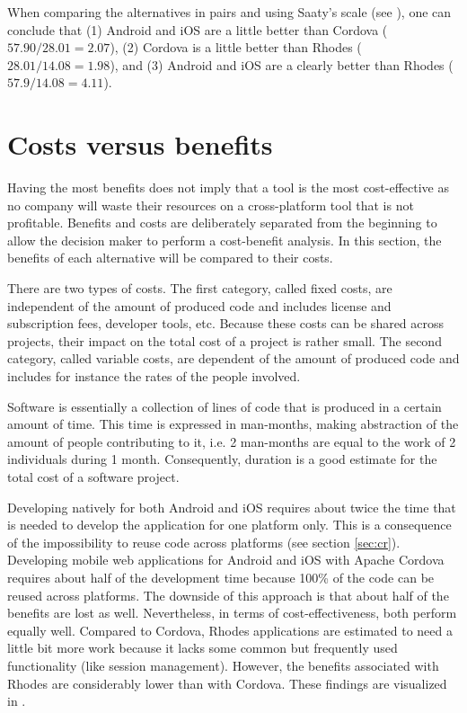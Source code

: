 When comparing the alternatives in pairs and using Saaty's scale (see ), one can conclude that (1) Android and iOS are a little better than Cordova ($57.90/28.01 = 2.07$), (2) Cordova is a little better than Rhodes ($28.01 / 14.08 = 1.98$), and (3) Android and iOS are a clearly better than Rhodes ($57.9 / 14.08 = 4.11$).

\section{Costs versus benefits}
\label{sec:ev:costben}

Having the most benefits does not imply that a tool is the most cost-effective as no company will waste their resources on a cross-platform tool that is not profitable. Benefits and costs are deliberately separated from the beginning to allow the decision maker to perform a cost-benefit analysis. In this section, the benefits of each alternative will be compared to their costs.

There are two types of costs. The first category, called fixed costs, are independent of the amount of produced code and includes license and subscription fees, developer tools, etc. Because these costs can be shared across projects, their impact on the total cost of a project is rather small. The second category, called variable costs, are dependent of the amount of produced code and includes for instance the rates of the people involved.

Software is essentially a collection of lines of code that is produced in a certain amount of time. This time is expressed in man-months, making abstraction of the amount of people contributing to it, i.e. 2 man-months are equal to the work of 2 individuals during 1 month. Consequently, duration is a good estimate for the total cost of a software project.

Developing natively for both Android and iOS requires about twice the time that is needed to develop the application for one platform only. This is a consequence of the impossibility to reuse code across platforms (see section \ref{sec:cr}). Developing mobile web applications for Android and iOS with Apache Cordova requires about half of the development time because 100\% of the code can be reused across platforms. The downside of this approach is that about half of the benefits are lost as well. Nevertheless, in terms of cost-effectiveness, both perform equally well. Compared to Cordova, Rhodes applications are estimated to need a little bit more work because it lacks some common but frequently used functionality (like session management). However, the benefits associated with Rhodes are considerably lower than with Cordova. These findings are visualized in .

